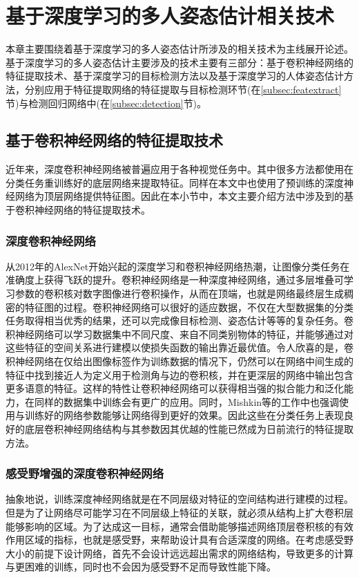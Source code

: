 \chapter{基于深度学习的多人姿态估计相关技术}
\label{cha:basicfacts}
本章主要围绕着基于深度学习的多人姿态估计所涉及的相关技术为主线展开论述。基于深度学习的多人姿态估计主要涉及的技术主要有三部分：基于卷积神经网络的特征提取技术、基于深度学习的目标检测方法以及基于深度学习的人体姿态估计方法，分别应用于特征提取网络的特征提取与目标检测环节(在\ref{subsec:featextract}节)与检测回归网络中(在\ref{subsec:detection}节)。
\section{基于卷积神经网络的特征提取技术}
近年来，深度卷积神经网络被普遍应用于各种视觉任务中。其中很多方法都使用在分类任务重训练好的底层网络来提取特征。同样在本文中也使用了预训练的深度神经网络为顶层网络提供特征图。因此在本小节中，本文主要介绍方法中涉及到的基于卷积神经网络的特征提取技术。
\subsection{深度卷积神经网络}
\label{subsec:factsfeature}
从2012年的AlexNet\cite{alex2012alexnet}开始兴起的深度学习和卷积神经网络热潮，让图像分类任务在准确度上获得飞跃的提升。卷积神经网络是一种深度神经网络，通过多层堆叠可学习参数的卷积核对数字图像进行卷积操作，从而在顶端，也就是网络最终层生成稠密的特征图的过程。卷积神经网络可以很好的适应数据，不仅在大型数据集的分类任务取得相当优秀的结果，还可以完成像目标检测、姿态估计等等的复杂任务。卷积神经网络可以学习数据集中不同尺度、来自不同类别物体的特征，并能够通过对这些特征的空间关系进行建模以使损失函数的输出靠近最优值。令人欣喜的是，卷积神经网络在仅给出图像标签作为训练数据的情况下，仍然可以在网络中间生成的特征中找到接近人为定义用于检测角与边的卷积核，并在更深层的网络中输出包含更多语意的特征\cite{yosinski2015understanding}。这样的特性让卷积神经网络可以获得相当强的拟合能力和泛化能力，在同样的数据集中训练会有更广的应用。同时，Mishkin等的工作中\cite{mishkin2015all}也强调使用与训练好的网络参数能够让网络得到更好的效果。因此这些在分类任务上表现良好的底层卷积神经网络结构与其参数因其优越的性能已然成为日前流行的特征提取方法。
\subsection{感受野增强的深度卷积神经网络}
\label{subsec:factsdeepextract}
抽象地说，训练深度神经网络就是在不同层级对特征的空间结构进行建模的过程。但是为了让网络尽可能学习在不同层级上特征的关联，就必须从结构上扩大卷积层能够影响的区域。为了达成这一目标，通常会借助能够描述网络顶层卷积核的有效作用区域的指标，也就是感受野，来帮助设计具有合适深度的网络。在考虑感受野大小的前提下设计网络，首先不会设计远远超出需求的网络结构，导致更多的计算与更困难的训练，同时也不会因为感受野不足而导致性能下降。

